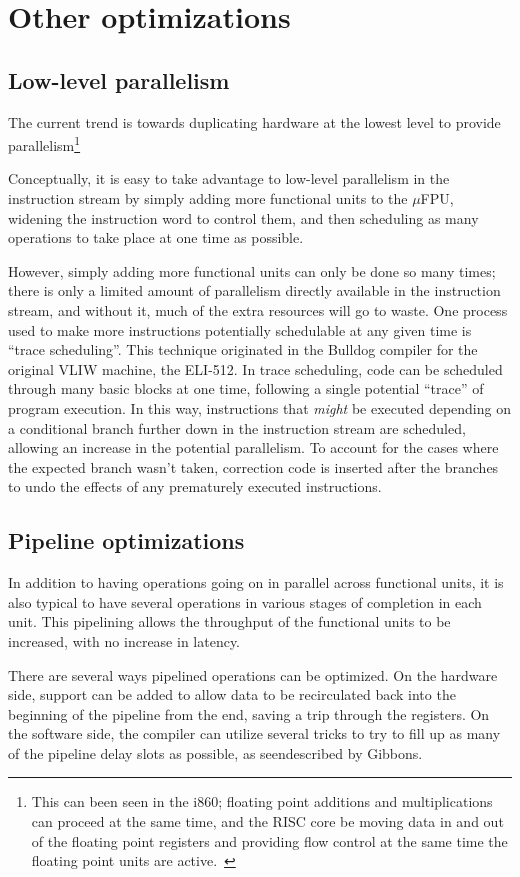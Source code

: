 \section{Other optimizations}

\subsection{Low-level parallelism}

The current trend is towards duplicating hardware at the lowest level to
provide parallelism\footnote{This can been seen in the i860; floating point
additions and multiplications can proceed at the same time, and the RISC
core be moving data in and out of the floating point registers and providing
flow control at the same time the floating point units are active.~\cite{byte:i860}}

Conceptually, it is easy to take advantage to low-level parallelism in the
instruction stream by simply adding more functional units to the $\mu$FPU,
widening the instruction word to control them, and then scheduling as many
operations to take place at one time as possible.

However, simply adding more functional units can only be done so many times;
there is only a limited amount of parallelism directly available in the
instruction stream, and without it, much of the extra resources will go to
waste.  One process used to make more instructions potentially schedulable
at any given time is ``trace scheduling''.  This technique originated in the
Bulldog compiler for the original VLIW machine, the ELI-512.
\cite{ellis:bulldog,colwell:vliw}  In trace scheduling, code can be
scheduled through many basic blocks at one time, following a single
potential ``trace'' of program execution.  In this way, instructions that
{\em might\/} be executed depending on a conditional branch further down in
the instruction stream are scheduled, allowing an increase in the potential
parallelism.  To account for the cases where the expected branch wasn't
taken, correction code is inserted after the branches to undo the effects of
any prematurely executed instructions.

\subsection{Pipeline optimizations}

In addition to having operations going on in parallel across functional
units, it is also typical to have several operations in various stages of
completion in each unit.  This pipelining allows the throughput of the
functional units to be increased, with no increase in latency.

There are several ways pipelined operations can be optimized.  On the
hardware side, support can be added to allow data to be recirculated back
into the beginning of the pipeline from the end, saving a trip through the
registers.  On the software side, the compiler can utilize several tricks to
try to fill up as many of the pipeline delay slots as possible, as
seendescribed by Gibbons.~\cite{gib86}


